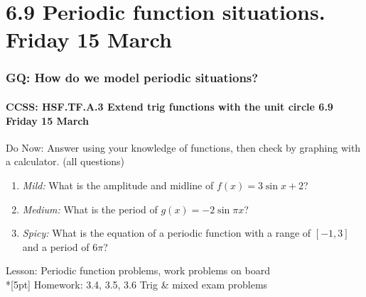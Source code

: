 \documentclass{beamer}
\begin{document}
\section{6.9 Periodic function situations. Friday 15 March}
  \frame
  {
    \frametitle{GQ: How do we model periodic situations?}
    \framesubtitle{CCSS: HSF.TF.A.3 Extend trig functions with the unit circle  \hfill \alert{6.9 Friday 15 March}}

    \begin{block}{Do Now: Answer using your knowledge of functions, then check by graphing with a calculator. (all questions)}
    \begin{enumerate}
        \item \emph{Mild:} What is the amplitude and midline of $f(x)=3 \sin x+2$?
        \item \emph{Medium:} What is the period of $g(x)=-2 \sin \pi x$?
        \item \emph{Spicy:} What is the equation of a periodic function with a range of $[-1,3]$ and a period of $6 \pi$?
    \end{enumerate}
    \end{block}
    Lesson: Periodic function problems, work problems on board\\*[5pt]
    Homework: 3.4, 3.5, 3.6 Trig \& mixed exam problems
  }
\end{document}
